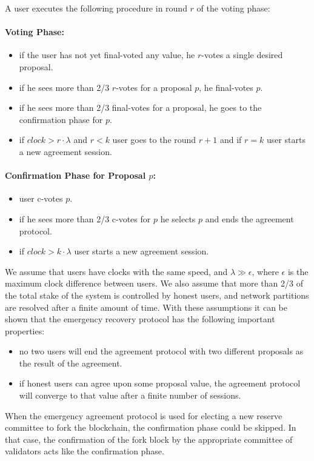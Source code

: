 A user executes the following procedure
in round $r$ of the voting phase:
\paragraph{Voting Phase:}
\begin{itemize}
    \item if the user has not yet final-voted any value, he $r$-votes a single desired proposal.
    \item if he sees more than 2/3 $r$-votes for a proposal $p$, he final-votes $p$.
    \item if he sees more than 2/3 final-votes for a proposal, he goes to the confirmation phase for $p$.
    \item if $clock > r \cdot \lambda$ and $r < k$ user goes to the round $r + 1$ and if $r = k$ user starts a
    new agreement session.
\end{itemize}
\paragraph{Confirmation Phase for Proposal $p$:}
\begin{itemize}
    \item user c-votes $p$.
    \item if he sees more than 2/3 c-votes for $p$ he selects $p$ and ends the agreement protocol.
    \item if $clock > k \cdot \lambda$ user starts a new agreement session.
\end{itemize}

We assume that users have clocks with the same speed, and $\lambda \gg \epsilon$, where $\epsilon$ is the maximum
clock difference between users. We also assume that more than 2/3 of the total stake of the system is controlled
by honest users, and network partitions are resolved after a finite amount of time. With these assumptions it can be
shown that the emergency recovery protocol has the following important properties:
\begin{itemize}
    \item no two users will end the agreement protocol with two different proposals as the result of the agreement.
    \item if honest users can agree upon some proposal value, the agreement protocol will converge to that value
    after a finite number of sessions.
\end{itemize}

When the emergency agreement protocol is used for electing a new reserve committee to fork the blockchain, the
confirmation phase could be skipped. In that case, the confirmation of the fork block by the appropriate committee
of validators acts like the confirmation phase.

